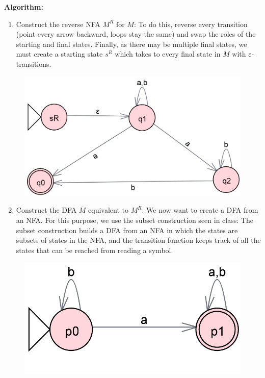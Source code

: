\documentclass[12pt]{article}
\begin{document}
\textbf{Algorithm:}

\begin{enumerate}
    \item Construct the reverse NFA $M^R$ for $M$: To do this, reverse every transition (point every arrow backward, loops stay the same) and swap the roles of the starting and final states. Finally, as there may be multiple final states, we must create a starting state $s^R$ which takes to every final state in $M$ with $\varepsilon$-transitions.
\end{enumerate}


\begin{figure}[h]
    \centering
    \includegraphics[width=0.7\linewidth]{First_Automaton_First_Step.png}
\end{figure}

\begin{enumerate}
    \setcounter{enumi}{1}
    \item Construct the DFA $\overline{M}$ equivalent to $M^R$: We now want to create a DFA from an NFA. For this purpose, we use the subset construction seen in class: The subset construction builds a DFA from an NFA in which the states are subsets of states in the NFA, and the transition function keeps track of all the states that can be reached from reading a symbol.
\end{enumerate}

\begin{figure}[h]
    \centering
    \includegraphics[width=0.7\linewidth]{First_Automaton_Second_Step.png}
\end{figure}
\end{document}
